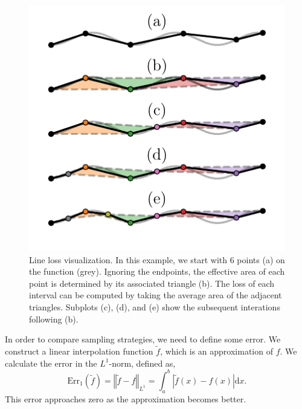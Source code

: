 \begin{figure}
\centering
\includegraphics{chapter_adaptive/figures/line_loss.pdf}
\caption{Line loss visualization.
In this example, we start with 6 points (a) on the function (grey).
Ignoring the endpoints, the effective area of each point is determined by its associated triangle (b).
The loss of each interval can be computed by taking the average area of the adjacent triangles.
Subplots (c), (d), and (e) show the subsequent interations following (b).\label{fig:line_loss}}
\end{figure}

In order to compare sampling strategies, we need to define some error.
We construct a linear interpolation function $\tilde{f}$, which is an approximation of $f$.
We calculate the error in the $L^{1}$-norm, defined as,
\[
\text{Err}_{1}(\tilde{f})=\left\Vert \tilde{f}-f\right\Vert _{L^{1}}=\int_{a}^{b}\left|\tilde{f}(x)-f(x)\right|\text{d}x.
\]
This error approaches zero as the approximation becomes better.

